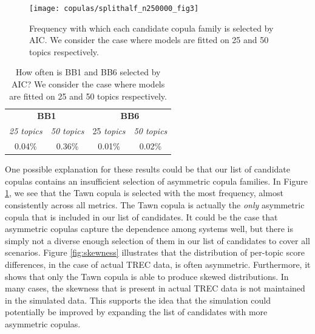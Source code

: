 \begin{figure}[!t]
	\centering	
	\texttt{[image: copulas/splithalf\_n250000\_fig3]}
	\caption{Frequency with which each candidate copula family is selected by AIC. We consider the case where models are fitted on 25 and 50 topics respectively.}
	\label{fig:copulas-splithalf-plot-3}
\end{figure}

\begin{table}[t]
	\centering
	\begin{tabular}{c c c c} %
		\toprule
		\multicolumn{2}{c}{\textbf{BB1}} & \multicolumn{2}{c}{\textbf{BB6}} \\ 
		\textit{25 topics} & \textit{50 topics} & 25 \textit{topics} & \textit{50 topics} \\
		\midrule
		0.04\% & 0.36\%  & 0.01\% & 0.02\% \\
		\bottomrule
	\end{tabular}
	\caption{How often is BB1 and BB6 selected by AIC? We consider the case where models are fitted on 25 and 50 topics respectively.}
	\label{tab:bb1&6-freq}
\end{table}

One possible explanation for these results could be that our list of candidate copulas contains an insufficient selection of asymmetric copula families. In Figure \ref{fig:copulas-splithalf-plot-3}, we see that the Tawn copula is selected with the most frequency, almost consistently across all metrics. The Tawn copula is actually the \textit{only} asymmetric copula that is included in our list of candidates. It could be the case that asymmetric copulas capture the dependence among systems well, but there is simply not a diverse enough selection of them in our list of candidates to cover all scenarios. Figure \ref{fig:skewness} illustrates that the distribution of per-topic score differences, in the case of actual TREC data, is often asymmetric. Furthermore, it shows that only the Tawn copula is able to produce skewed distributions. In many cases, the skewness that is present in actual TREC data is not maintained in the simulated data. This supports the idea that the simulation could potentially be improved by expanding the list of candidates with more asymmetric copulas.

